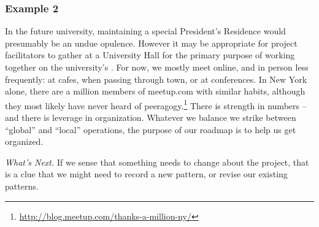 \subsubsection*{Example 2}
In the future university, maintaining a special President's Residence
would presumably be an undue opulence.  However it may be appropriate
for project facilitators to gather at a University Hall for the
primary purpose of working together on the university's
.  For now, we mostly meet online, and in person
less frequently: at cafes, when passing through town, or at
conferences.  In New York alone, there are a million members of
meetup.com with similar habits, although they most likely have never
heard of
peeragogy.\footnote{\url{http://blog.meetup.com/thanks-a-million-ny/}}
There is strength in numbers -- and there is leverage in organization.
Whatever we balance we strike between ``global'' and ``local''
operations, the purpose of our roadmap is to help us get organized.

\begin{framed}
\noindent
\emph{What's Next.}
If we sense that something needs to change about the project, that is a clue that we might need to record a new pattern, or revise our existing patterns.
\end{framed}
